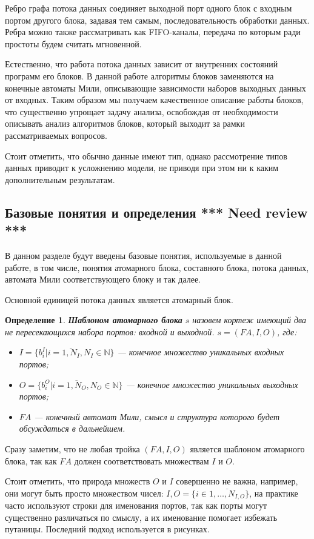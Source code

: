 \documentclass[10pt,a4paper]{article}
\newtheorem{defen}{Определение}
\newcommand{\FA}{F\!A}
\begin{document}
Ребро графа потока данных соединяет выходной порт одного блок с входным портом другого блока, задавая тем самым, последовательность обработки данных.
Ребра можно также рассматривать как FIFO-каналы, передача по которым ради простоты будем считать мгновенной.

Естественно, что работа потока данных зависит от внутренних состояний программ его блоков. В данной работе алгоритмы блоков заменяются на конечные автоматы Мили,
описывающие зависимости наборов выходных данных от входных. Таким образом мы получаем качественное описание работы блоков, что существенно упрощает
задачу анализа, освобождая от необходимости описывать анализ алгоритмов блоков, который выходит за рамки рассматриваемых вопросов.

Стоит отметить, что обычно данные имеют тип, однако рассмотрение типов данных приводит к усложнению модели,
не приводя при этом ни к каким дополнительным результатам.

\subsection{Базовые понятия и определения \textbf{*** Need review ***}}
В данном разделе будут введены базовые понятия, используемые в данной работе, в том числе,
понятия атомарного блока, составного блока, потока данных, автомата Мили соответствующего блоку и так далее.

Основной единицей потока данных является атомарный блок.
\begin{defen}
  \textbf{Шаблоном атомарного блока} $s$ назовем кортеж имеющий два не пересекающихся набора портов: \textit{входной} и \textit{выходной}.
  $s = (\FA, I, O)$, где:
  \begin{itemize}
    \item $I = \{b^I_i \vert i = \overline{1, N_I}, N_I \in \mathbb{N}\}$ --- конечное множество уникальных входных портов;
    \item $O = \{b^O_i \vert i = \overline{1, N_O}, N_O \in \mathbb{N}\}$ --- конечное множество уникальных выходных портов;
    \item $\FA$ --- конечный автомат Мили, смысл и структура которого будет обсуждаться в дальнейшем.
  \end{itemize}
\end{defen}
Сразу заметим, что не любая тройка $(\FA, I, O)$ является шаблоном атомарного блока, так как $\FA$ должен
соответствовать множествам $I$ и $O$.

Стоит отметить, что природа множеств $O$ и $I$ совершенно не важна, например, они могут быть просто множеством чисел: $I, O = \{i \in \overline{1, \dots, N_{I, O}}\}$,
на практике часто используют строки для именования портов, так как порты могут существенно различаться по смыслу, а их именование помогает избежать путаницы.
Последний подход используется в рисунках.
\end{document}
